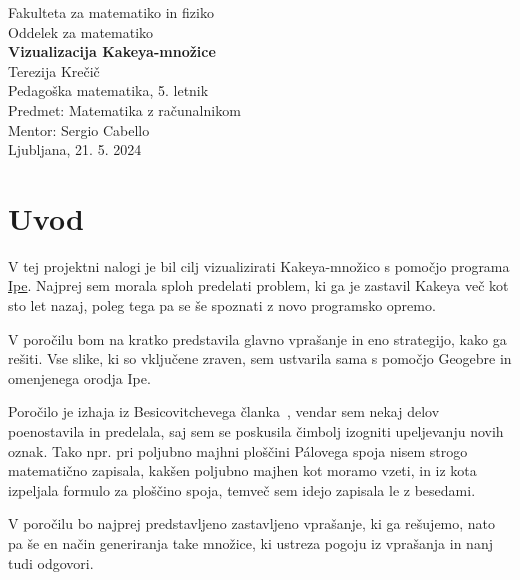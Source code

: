 \documentclass[a4paper, 12pt]{article}
\begin{document}
\begin{titlepage}
    \begin{center}
        \large
        Fakulteta za matematiko in fiziko\\
        Oddelek za matematiko \\
        \vspace{6cm}
        \Huge
        \textbf{Vizualizacija Kakeya-množice} \\
        \vspace{6cm}
        \large
        Terezija Krečič\\
        Pedagoška matematika, 5. letnik\\
        \vspace{1cm}
        Predmet: Matematika z računalnikom \\
        Mentor: Sergio Cabello\\
        \vspace{2cm}
        Ljubljana, 21. 5. 2024
    \end{center}
\end{titlepage}

\newpage



\section*{Uvod}

V tej projektni nalogi je bil cilj vizualizirati Kakeya-množico s pomočjo programa \href{https://ipe.otfried.org/}{Ipe}. Najprej sem morala sploh predelati problem, ki ga je zastavil Kakeya več kot sto let nazaj, poleg tega pa se še spoznati z novo programsko opremo.

V poročilu bom na kratko predstavila glavno vprašanje in eno strategijo, kako ga rešiti. Vse slike, ki so vključene zraven, sem ustvarila sama s pomočjo Geogebre in omenjenega orodja Ipe. 

Poročilo je izhaja iz Besicovitchevega članka~\cite{Besicovitch}, vendar sem nekaj delov poenostavila in predelala, saj sem se poskusila čimbolj izogniti upeljevanju novih oznak. Tako npr. pri poljubno majhni ploščini Pálovega spoja nisem strogo matematično zapisala, kakšen poljubno majhen kot moramo vzeti, in iz kota izpeljala formulo za ploščino spoja, temveč sem idejo zapisala le z besedami.

V poročilu bo najprej predstavljeno zastavljeno vprašanje, ki ga rešujemo, nato pa še en način generiranja take množice, ki ustreza pogoju iz vprašanja in nanj tudi odgovori.
\end{document}
